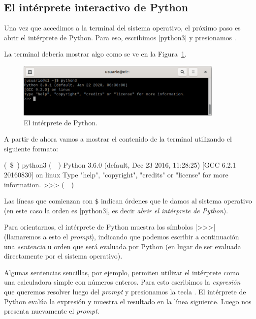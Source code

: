 \subsection{El intérprete interactivo de Python}

Una vez que accedimos a la terminal del sistema operativo, el próximo paso es
abrir el intérprete de Python. Para eso, escribimos |python3| y presionamos
.

La terminal debería mostrar algo como se ve en la Figura~\ref{fig:terminal2}.

\begin{figure}[ht]
\begin{center}
\includegraphics[width=0.9\textwidth]{graficos/terminal2}
\end{center}
\caption{El intérprete de Python.}
\label{fig:terminal2}
\end{figure}

\edef\myindent{\the\parindent}%
\noindent%
\begin{minipage}{\textwidth}\setlength{\parindent}{\myindent}
A partir de ahora vamos a mostrar el contenido de la terminal utilizando el
siguiente formato:

\begin{codigo-nohl-sn}
(~\$~) python3 (~~)
Python 3.6.0 (default, Dec 23 2016, 11:28:25)
[GCC 6.2.1 20160830] on linux
Type "help", "copyright", "credits" or "license" for more information.
>>> (~~)
\end{codigo-nohl-sn}
\end{minipage}

 Las líneas que comienzan con \verb|$| indican órdenes que le damos
al sistema operativo (en este caso la orden es |python3|, es decir \emph{abrir
el intérprete de Python}).

 Para orientarnos, el intérprete de Python muestra los símbolos |>>>|
(llamaremos a esto el \emph{prompt}), indicando que podemos escribir a continuación una
\emph{sentencia} u orden que será evaluada por Python (en lugar de ser evaluada
directamente por el sistema operativo).

Algunas sentencias sencillas, por ejemplo, permiten utilizar el intérprete como
una calculadora simple con números enteros. Para esto escribimos la
\emph{expresión} que queremos resolver luego del \emph{prompt} y presionamos la tecla
. El intérprete de Python evalúa la expresión y muestra el
resultado en la línea siguiente. Luego nos presenta nuevamente el \emph{prompt}.

